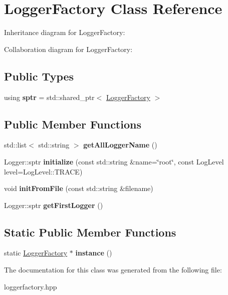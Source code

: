 \hypertarget{classLoggerFactory}{}\section{Logger\+Factory Class Reference}
\label{classLoggerFactory}


Inheritance diagram for Logger\+Factory\+:


Collaboration diagram for Logger\+Factory\+:
\subsection*{Public Types}
\begin{DoxyCompactItemize}
\item 
\mbox{\label{classLoggerFactory_a6c68d0fbb07ed40a1c9dc58bb1114ca8}} 
using {\bfseries sptr} = std\+::shared\+\_\+ptr$<$ \hyperlink{classLoggerFactory}{Logger\+Factory} $>$
\end{DoxyCompactItemize}
\subsection*{Public Member Functions}
\begin{DoxyCompactItemize}
\item 
\mbox{\label{classLoggerFactory_ac58faf601a996f65566383c6e68809aa}} 
std\+::list$<$ std\+::string $>$ {\bfseries get\+All\+Logger\+Name} ()
\item 
\mbox{\label{classLoggerFactory_a04c7160b91518207c0da0834c5961463}} 
Logger\+::sptr {\bfseries initialize} (const std\+::string \&name=\char`\"{}root\char`\"{}, const Log\+Level level=Log\+Level\+::\+T\+R\+A\+CE)
\item 
\mbox{\label{classLoggerFactory_a7d14bb3a52dbce19650fc09018e2a301}} 
void {\bfseries init\+From\+File} (const std\+::string \&filename)
\item 
\mbox{\label{classLoggerFactory_ae2445b06398a8180cdd3dbb4e1f7111b}} 
Logger\+::sptr {\bfseries get\+First\+Logger} ()
\end{DoxyCompactItemize}
\subsection*{Static Public Member Functions}
\begin{DoxyCompactItemize}
\item 
\mbox{\label{classLoggerFactory_a029ce9e22f1d9e89b989f089e1d253eb}} 
static \hyperlink{classLoggerFactory}{Logger\+Factory} $\ast$ {\bfseries instance} ()
\end{DoxyCompactItemize}


The documentation for this class was generated from the following file\+:\begin{DoxyCompactItemize}
\item 
loggerfactory.\+hpp\end{DoxyCompactItemize}
